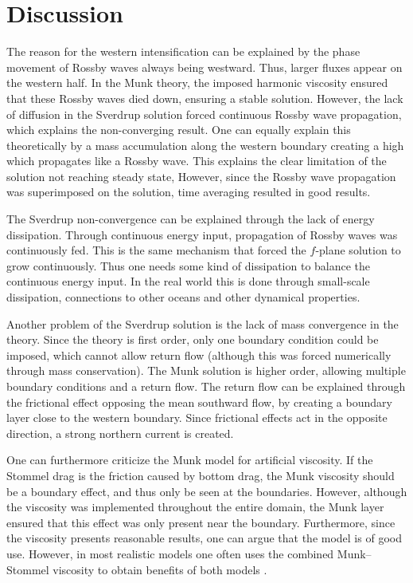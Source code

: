 \section{Discussion}
The reason for the western intensification can be explained by the phase movement of Rossby waves always being westward. Thus, larger fluxes appear on the western half. In the Munk theory, the imposed harmonic viscosity ensured that these Rossby waves died down, ensuring a stable solution. However, the lack of diffusion in the Sverdrup solution forced continuous Rossby wave propagation, which explains the non-converging result. One can equally explain this theoretically by a mass accumulation along the western boundary creating a high which propagates like a Rossby wave. This explains the clear limitation of the solution not reaching steady state, However, since the Rossby wave propagation was superimposed on the solution, time averaging resulted in good results. 

The Sverdrup non-convergence can be explained through the lack of energy dissipation. Through continuous energy input, propagation of Rossby waves was continuously fed. This is the same mechanism that forced the $f$-plane solution to grow continuously. Thus one needs some kind of dissipation to balance the continuous energy input. In the real world this is done through small-scale dissipation, connections to other oceans and other dynamical properties. 

Another problem of the Sverdrup solution is the lack of mass convergence in the theory. Since the theory is first order, only one boundary condition could be imposed, which cannot allow return flow (although this was forced numerically through mass conservation). The Munk solution is higher order, allowing multiple boundary conditions and a return flow. The return flow can be explained through the frictional effect opposing the mean southward flow, by creating a boundary layer close to the western boundary. Since frictional effects act in the opposite direction, a strong northern current is created. 

One can furthermore criticize the Munk model for artificial viscosity. If the Stommel drag is the friction caused by bottom drag, the Munk viscosity should be a boundary effect, and thus only be seen at the boundaries. However, although the viscosity was implemented throughout the entire domain, the Munk layer ensured that this effect was only present near the boundary. Furthermore, since the viscosity presents reasonable results, one can argue that the model is of good use. However, in most realistic models one often uses the combined Munk--Stommel viscosity to obtain benefits of both models \citep{Vallis06}. 


